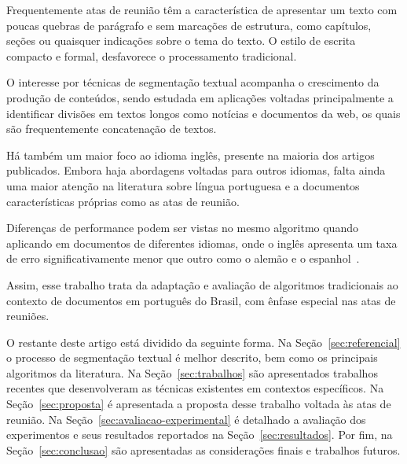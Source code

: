 Frequentemente atas de reunião têm a característica de apresentar um texto com poucas quebras de parágrafo e sem marcações de estrutura, como capítulos, seções ou quaisquer indicações sobre o tema do texto. O estilo de escrita compacto e formal, desfavorece o processamento tradicional.

O interesse por técnicas de segmentação textual acompanha o crescimento da produção de conteúdos, sendo estudada em aplicações voltadas principalmente a identificar divisões em
textos longos como notícias e documentos da web, os quais são frequentemente concatenação de textos. 


Há também um maior foco ao idioma inglês, presente na maioria dos artigos publicados. Embora haja abordagens voltadas para outros idiomas, falta ainda uma maior atenção na literatura sobre língua portuguesa e a documentos características próprias como as atas de reunião.

Diferenças de performance podem ser vistas no mesmo algoritmo quando aplicando em documentos de diferentes idiomas, onde o inglês apresenta um taxa de erro significativamente menor que outro como o alemão e o espanhol~\cite{Kern2009}.


Assim, esse trabalho trata da adaptação e avaliação de algoritmos tradicionais ao contexto de documentos em português do Brasil, com ênfase especial nas atas de reuniões.

O restante deste artigo está dividido da seguinte forma. Na Seção~\ref{sec:referencial} o processo de segmentação textual é melhor descrito, bem como os principais algoritmos da literatura. Na Seção~\ref{sec:trabalhos} são apresentados trabalhos recentes que desenvolveram as técnicas existentes em contextos específicos. Na Seção~\ref{sec:proposta} é apresentada a proposta desse trabalho voltada às atas de reunião. Na Seção~\ref{sec:avaliacao-experimental} é detalhado a avaliação dos experimentos e seus resultados reportados na Seção~\ref{sec:resultados}. Por fim, na Seção~\ref{sec:conclusao} são apresentadas as considerações finais e trabalhos futuros.








